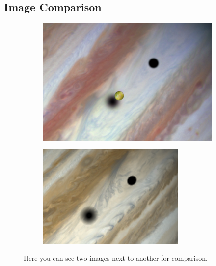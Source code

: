 \subsection{Image Comparison}\label{subsec:image-comparison}
\begin{figure}[h]
    \begin{subfigure}[h]{0.45\textwidth}
        \includegraphics[width=\textwidth]{chapter01/images/HubbleJupiterEclipse2015}
    \end{subfigure}
    \hfill\vrule\hfill
    \begin{subfigure}[h]{0.45\textwidth}
        \includegraphics[width=\textwidth]{chapter01/images/CosmoGraphiaEclipseJupiter2015}
    \end{subfigure}

    \caption{Here you can see two images next to another for comparison.}
    \label{fig:image-comparison}
\end{figure}

